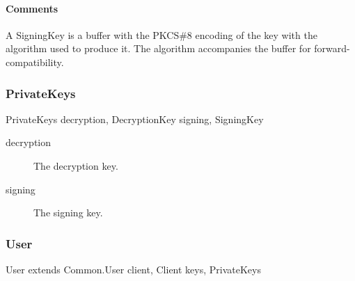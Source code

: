 \documentclass[a4paper,10pt]{article}
\begin{document}
\begin{center}
\theverbbox
\end{center}

\begin{inparaitem}[ ]
 \item \infrastructure
\end{inparaitem}

\paragraph*{Comments}
A SigningKey is a buffer with the PKCS\#8 encoding of the key with the algorithm used to produce it. The algorithm accompanies the buffer for forward-compatibility.

\subsubsection{PrivateKeys}
\label{sec:structure:client:private_keys}

\begin{verbbox}
PrivateKeys
{
  decryption, DecryptionKey
  signing, SigningKey
}
\end{verbbox}
\begin{center}
\theverbbox
\end{center}

\begin{inparaitem}[ ]
 \item \infrastructure
\end{inparaitem}

\SpecialItem
\begin{description}
 \item[decryption] The decryption key.
 \item[signing] The signing key.
\end{description}

\subsubsection{User}

\begin{verbbox}
User extends Common.User
{
  client, Client
  keys, PrivateKeys
}
\end{verbbox}
\begin{center}
\theverbbox
\end{center}
\end{document}
